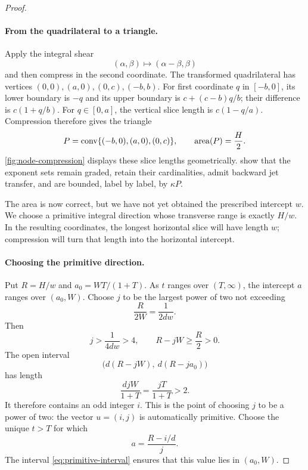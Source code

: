 \begin{proof}
\paragraph{From the quadrilateral to a triangle.}
Apply the integral shear
\[
 (\alpha,\beta)\longmapsto(\alpha-\beta,\beta)
\]
and then compress in the second coordinate.  The transformed quadrilateral has vertices $(0,0),(a,0),(0,c),(-b,b)$.  For first coordinate $q$ in $[-b,0]$, its lower boundary is $-q$ and its upper boundary is $c+(c-b)q/b$; their difference is $c(1+q/b)$.  For $q\in[0,a]$, the vertical slice length is $c(1-q/a)$.  Compression therefore gives the triangle
\begin{equation}\label{eq:compressed-triangle}
 P=\operatorname{conv}\{(-b,0),(a,0),(0,c)\},\qquad
 \operatorname{area}(P)=\frac H2.
\end{equation}
\cref{fig:node-compression} displays these slice lengths geometrically.  show that the exponent sets remain graded, retain their cardinalities, admit backward jet transfer, and are bounded, label by label, by $\kappa P$.

\ReshapingNodeFigure

The area is now correct, but we have not yet obtained the prescribed intercept $w$.  We choose a primitive integral direction whose transverse range is exactly $H/w$.  In the resulting coordinates, the longest horizontal slice will have length $w$; compression will turn that length into the horizontal intercept.

\paragraph{Choosing the primitive direction.}
Put $R=H/w$ and $a_0=WT/(1+T)$.  As $t$ ranges over $(T,\infty)$, the intercept $a$ ranges over $(a_0,W)$.  Choose $j$ to be the largest power of two not exceeding
\[
 \frac{R}{2W}=\frac{1}{2dw}.
\]
Then
\begin{equation}\label{eq:primitive-j}
 j>\frac{1}{4dw}>4,
 \qquad R-jW\ge\frac R2>0.
\end{equation}
The open interval
\begin{equation}\label{eq:primitive-interval}
 \bigl(d(R-jW),\ d(R-ja_0)\bigr)
\end{equation}
has length
\[
 \frac{djW}{1+T}=\frac{jT}{1+T}>2.
\]
It therefore contains an odd integer $i$.  This is the point of choosing $j$ to be a power of two: the vector $u=(i,j)$ is automatically primitive. Choose the unique $t>T$ for which
\begin{equation}\label{eq:tuned-intercept}
 a=\frac{R-i/d}{j}.
\end{equation}
The interval \eqref{eq:primitive-interval} ensures that this value lies in $(a_0,W)$.


\end{proof}
